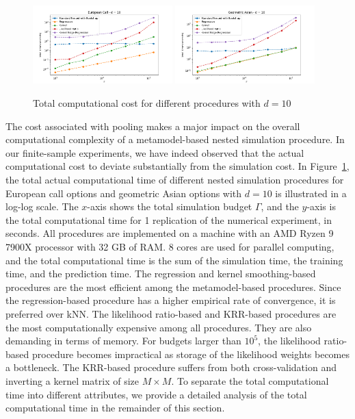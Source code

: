 \begin{figure}[ht!]
    \centering
    \includegraphics[width=0.48\textwidth]{./project1/figures/figure11a.png}
    \includegraphics[width=0.48\textwidth]{./project1/figures/figure11b.png}
    \caption{Total computational cost for different procedures with $d=10$}
    \label{fig1:tcc}
\end{figure}

The cost associated with pooling makes a major impact on the overall computational complexity of a metamodel-based nested simulation procedure.
In our finite-sample experiments, we have indeed observed that the actual computational cost to deviate substantially from the simulation cost.
In Figure~\ref{fig1:tcc}, the total actual computational time of different nested simulation procedures for European call options and geometric Asian options with $d = 10$ is illustrated in a log-log scale.
The $x$-axis shows the total simulation budget $\Gamma$, and the $y$-axis is the total computational time for 1 replication of the numerical experiment, in seconds.
All procedures are implemented on a machine with an AMD Ryzen 9 7900X processor with 32 GB of RAM.
8 cores are used for parallel computing, and the total computational time is the sum of the simulation time, the training time, and the prediction time.
The regression and kernel smoothing-based procedures are the most efficient among the metamodel-based procedures.
Since the regression-based procedure has a higher empirical rate of convergence, it is preferred over kNN.
The likelihood ratio-based and KRR-based procedures are the most computationally expensive among all procedures.
They are also demanding in terms of memory.
For budgets larger than $10^5$, the likelihood ratio-based procedure becomes impractical as storage of the likelihood weights becomes a bottleneck.
The KRR-based procedure suffers from both cross-validation and inverting a kernel matrix of size $M \times M$.
To separate the total computational time into different attributes, we provide a detailed analysis of the total computational time in the remainder of this section.

